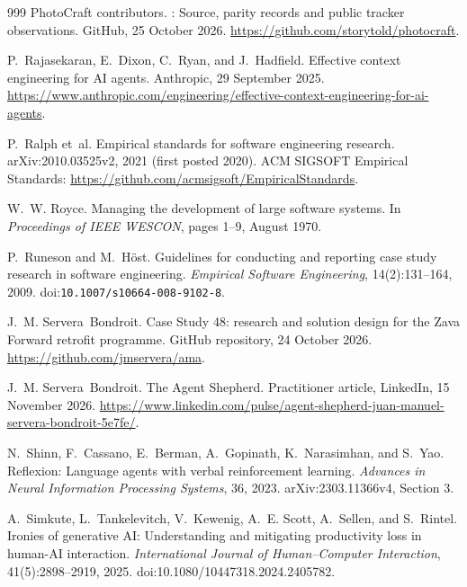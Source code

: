 \documentclass[11pt,a4paper]{article}
\begin{document}
\begin{thebibliography}{999}
{PhotoCraft contributors}.
: Source, parity records and public tracker observations.
\newblock GitHub, 25 October 2026.
\newblock \url{https://github.com/storytold/photocraft}.

P.~Rajasekaran, E.~Dixon, C.~Ryan, and J.~Hadfield.
\newblock Effective context engineering for {AI} agents.
\newblock Anthropic, 29 September 2025.
\newblock \url{https://www.anthropic.com/engineering/effective-context-engineering-for-ai-agents}.

P.~Ralph et~al.
\newblock Empirical standards for software engineering research.
\newblock arXiv:2010.03525v2, 2021 (first posted 2020).
\newblock ACM SIGSOFT Empirical Standards:
\url{https://github.com/acmsigsoft/EmpiricalStandards}.

W.~W. Royce.
\newblock Managing the development of large software systems.
\newblock In \emph{Proceedings of IEEE WESCON}, pages 1--9, August 1970.

P.~Runeson and M.~H\"ost.
\newblock Guidelines for conducting and reporting case study research in
software engineering.
\newblock \emph{Empirical Software Engineering}, 14(2):131--164, 2009.
\newblock doi:\nolinkurl{10.1007/s10664-008-9102-8}.

J.~M. Servera~Bondroit.
 Case Study 48: research and solution design for the Zava
Forward retrofit programme.
\newblock GitHub repository, 24 October 2026.
\newblock \url{https://github.com/jmservera/ama}.

J.~M. Servera~Bondroit.
\newblock The Agent Shepherd.
\newblock Practitioner article, LinkedIn, 15 November 2026.
\newblock \url{https://www.linkedin.com/pulse/agent-shepherd-juan-manuel-servera-bondroit-5e7fe/}.

N.~Shinn, F.~Cassano, E.~Berman, A.~Gopinath, K.~Narasimhan, and S.~Yao.
\newblock Reflexion: Language agents with verbal reinforcement learning.
\newblock \emph{Advances in Neural Information Processing Systems}, 36, 2023.
\newblock arXiv:2303.11366v4, Section 3.

A.~Simkute, L.~Tankelevitch, V.~Kewenig, A.~E. Scott, A.~Sellen, and
S.~Rintel.
\newblock Ironies of generative {AI}: Understanding and mitigating
productivity loss in human-{AI} interaction.
\newblock \emph{International Journal of Human--Computer Interaction},
41(5):2898--2919, 2025.
\newblock doi:10.1080/10447318.2024.2405782.


\end{thebibliography}
\end{document}
